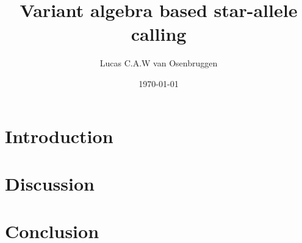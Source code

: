 \documentclass[a4paper]{article}
\title{Variant algebra based star-allele calling}
\author[1]{Lucas C.A.W van Osenbruggen}
\affil[1]{Leiden institute of advanced computer science, Leiden University}
\date{\today}
\begin{document}
%
\maketitle
\newpage
%
\begin{abstract}

\end{abstract}
\newpage
%
\section{Introduction}

\newpage
%
%
\section{Discussion}

\newpage
%
\section{Conclusion}

\newpage
%
\printbibliography
%
\end{document}
